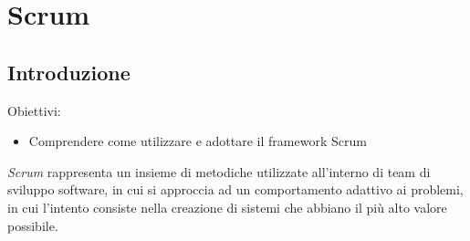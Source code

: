 \documentclass{article}
\begin{document}
\pagestyle{empty}
\section*{Scrum}
\large

\subsection*{Introduzione}
\large
Obiettivi:
\begin{itemize}
    \renewcommand{\labelitemi}{-}
    \itemsep0em
    \item Comprendere come utilizzare e adottare il framework Scrum 
\end{itemize}
\textit{Scrum} rappresenta un insieme di metodiche utilizzate all'interno di team di sviluppo software, in cui si approccia ad un comportamento adattivo ai problemi, in cui l'intento consiste nella creazione di sistemi che abbiano il più alto valore possibile. 
\end{document}
